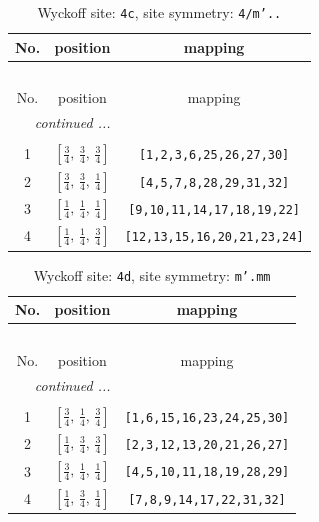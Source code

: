 \documentclass[fleqn,8pt]{jsarticle}
\begin{document}
\renewcommand{\arraystretch}{1.2}
\begin{longtable}{ccc}
\caption{Wyckoff site: {\tt 4c}, site symmetry: {\tt 4/m'..}}
 \\
 \hline \hline
No. & position & mapping \\ \hline \endfirsthead

\multicolumn{2}{l}{\tablename\ \thetable{}} \\
 \hline \hline
No. & position & mapping \\ \hline \endhead

 \hline \hline
\multicolumn{2}{r}{\footnotesize\it continued ...} \\ \endfoot

 \hline \hline
\multicolumn{2}{r}{} \\ \endlastfoot

1 & $\left[ \frac{3}{4},\, \frac{3}{4},\, \frac{3}{4} \right]$ & {\tt [1,2,3,6,25,26,27,30]} \\ \hline
2 & $\left[ \frac{3}{4},\, \frac{3}{4},\, \frac{1}{4} \right]$ & {\tt [4,5,7,8,28,29,31,32]} \\ \hline
3 & $\left[ \frac{1}{4},\, \frac{1}{4},\, \frac{1}{4} \right]$ & {\tt [9,10,11,14,17,18,19,22]} \\ \hline
4 & $\left[ \frac{1}{4},\, \frac{1}{4},\, \frac{3}{4} \right]$ & {\tt [12,13,15,16,20,21,23,24]} \\
\end{longtable}
\renewcommand{\arraystretch}{1.2}
\begin{longtable}{ccc}
\caption{Wyckoff site: {\tt 4d}, site symmetry: {\tt m'.mm}}
 \\
 \hline \hline
No. & position & mapping \\ \hline \endfirsthead

\multicolumn{2}{l}{\tablename\ \thetable{}} \\
 \hline \hline
No. & position & mapping \\ \hline \endhead

 \hline \hline
\multicolumn{2}{r}{\footnotesize\it continued ...} \\ \endfoot

 \hline \hline
\multicolumn{2}{r}{} \\ \endlastfoot

1 & $\left[ \frac{3}{4},\, \frac{1}{4},\, \frac{3}{4} \right]$ & {\tt [1,6,15,16,23,24,25,30]} \\ \hline
2 & $\left[ \frac{1}{4},\, \frac{3}{4},\, \frac{3}{4} \right]$ & {\tt [2,3,12,13,20,21,26,27]} \\ \hline
3 & $\left[ \frac{3}{4},\, \frac{1}{4},\, \frac{1}{4} \right]$ & {\tt [4,5,10,11,18,19,28,29]} \\ \hline
4 & $\left[ \frac{1}{4},\, \frac{3}{4},\, \frac{1}{4} \right]$ & {\tt [7,8,9,14,17,22,31,32]} \\
\end{longtable}
\end{document}
